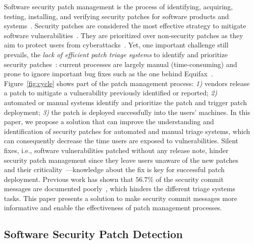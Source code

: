 Software security patch management is the process of identifying, acquiring,
testing, installing, and verifying security patches for software products and systems~\cite{DISSANAYAKE2022106771}. 
Security patches are considered the most effective strategy to mitigate software vulnerabilities~\cite{DISSANAYAKE2022106771,SOFT-PATCH-MANAG-NIST,10.1145/2660267.2660329}.
They are prioritized over non-security patches as they aim to protect users from cyberattacks~\cite{SOFT-PATCH-MANAG-NIST}. 
Yet, one important challenge still prevails, the \emph{lack of efficient patch triage systems} to identify and prioritize security patches~\cite{Zhang2021AnIO, SSPatcher2022,hacker-news-patches,DBLP:conf/soups/LiRMMC19}: current processes are largely manual (time-consuming) and prone to ignore important bug fixes such as the one behind Equifax~\cite{failed-to-deploy-patch}.
Figure~\ref{fig:cycle} shows part of the patch management process: \emph{1)} vendors release a patch to mitigate a vulnerability previously identified or reported; \emph{2)} automated or manual systems identify and prioritize the patch and trigger patch deployment; \emph{3)} the patch is deployed successfully into the users' machines. In this paper, we propose a solution that can improve the understanding and identification of security patches for automated and manual triage systems, which can consequently decrease the time users are exposed to vulnerabilities. 
Silent fixes, i.e., software vulnerabilities patched without any release note, hinder security patch management since they leave users unaware of the new patches and their criticality~\cite{Householder2020}---knowledge about the fix is key for successful patch deployment. 
Previous work has shown that $56.7\%$ of the security commit messages are documented poorly~\cite{10.1145/3593434.3593481}, which hinders the different triage systems tasks.
This paper presents a solution to make security commit messages more informative and enable the effectiveness of patch management processes.

\subsection{Software Security Patch Detection}

